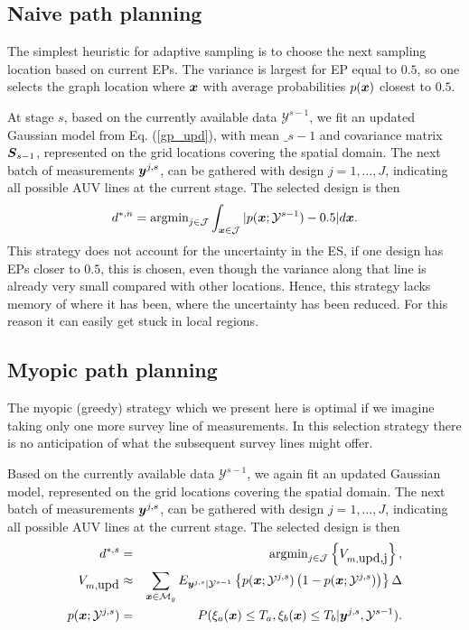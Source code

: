 \documentclass[aoas]{imsart}
\begin{document}
\subsection{Naive path planning}
\label{naive}

The simplest heuristic for adaptive sampling is to choose the next sampling location based on current EPs. The variance is largest for EP equal to $0.5$, so one selects the graph location where ${\boldsymbol x}$ with average probabilities $p({\boldsymbol x})$ closest to $0.5$. 

At stage $s$, based on the currently available data $\mathcal{Y}^{s-1}$, we fit an updated Gaussian model from Eq. (\ref{gp_upd}), with mean $\bm_{s-1}$ and covariance matrix ${\boldsymbol S}_{s-1}$, represented on the grid locations covering the spatial domain. 
The next batch of measurements ${\boldsymbol y}^{j,s}$, can be  gathered with design $j=1,\ldots,J$, indicating all possible AUV lines at the current stage. The selected design is then
\begin{equation}\label{critNaive}
    d^{*,n} = \mbox{argmin}_{j \in \mathcal{J}} \int_{\bx \in \mathcal{J}} |p(\bx;\mathcal{Y}^{s-1})-0.5| d\bx. 
\end{equation}
This strategy does not account for the uncertainty in the ES, if one design has EPs closer to $0.5$, this is chosen, even though the variance along that line is already very small compared with other locations. Hence, this strategy lacks memory of where it has been, where the uncertainty has been reduced. For this reason it can easily get stuck in local regions. 

\subsection{Myopic path planning}
\label{myopic}

The myopic (greedy) strategy which we present here is optimal if we imagine taking only one more survey line of measurements. In this selection strategy there is no anticipation of what the subsequent survey lines might offer. 

Based on the currently available data $\mathcal{Y}^{s-1}$, we again fit an updated Gaussian model, represented on the grid locations covering the spatial domain. 
The next batch of measurements ${\boldsymbol y}^{j,s}$, can be  gathered with design $j=1,\ldots,J$, indicating all possible AUV lines at the current stage. The selected design is then
\begin{eqnarray}\label{critSEQ}
    d^{*,s} &=& \mbox{argmin}_{j \in \mathcal{J}} \left\{ V_{m,\mbox{upd,j}} \right\},  \\
V_{m,\mbox{upd}} & \approx & \sum_{\bx \in \mathcal{M}_g} E_{\by^{j,s}|\mathcal{Y}^{s-1}} \left\{ p(\bx;\mathcal{Y}^{j,s})\left( 1-p(\bx;\mathcal{Y}^{j,s})\right) \right\} \Delta \nonumber \\
    p(\bx;\mathcal{Y}^{j,s}) &=& P(\xi_a(\bx) \leq T_a, \xi_b(\bx) \leq T_b |\by^{j,s},\mathcal{Y}^{s-1}). \nonumber
\end{eqnarray}
\end{document}
